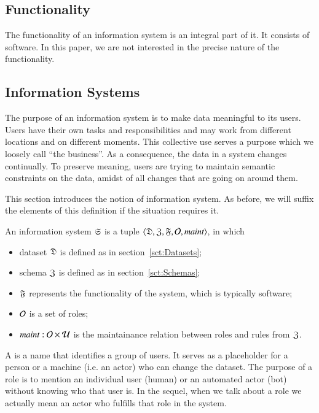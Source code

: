 \documentclass{elsarticle}
\begin{document}

\subsection{Functionality}
   The functionality of an information system is an integral part of it.
   It consists of software.
   In this paper, we are not interested in the precise nature of the functionality.

\subsection{Information Systems}
\label{sct:Information Systems}
   The purpose of an information system is to make data meaningful to its users.
   Users have their own tasks and responsibilities
   and may work from different locations and on different moments.
   This collective use serves a purpose which we loosely call ``the business''.
   As a consequence, the data in a system changes continually.
   To preserve meaning, users are trying to maintain semantic constraints on the data,
   amidst of all changes that are going on around them.

   This section introduces the notion of information system.
   As before, we will suffix the elements of this definition if the situation requires it.
\begin{definition}
\label{def:information system}
\item An information system $\mathfrak{S}$ is a tuple $\langle\mathfrak{D},\mathfrak{Z},\mathfrak{F},\mathcal{O},\text{\it maint\/}\rangle$, in which
\begin{itemize}
   \item dataset $\mathfrak{D}$ is defined as in section~\ref{sct:Datasets};
   \item schema $\mathfrak{Z}$ is defined as in section~\ref{sct:Schemas};
   \item $\mathfrak{F}$ represents the functionality of the system, which is typically software;
   \item $\mathcal{O}$ is a set of roles;
   \item $\text{\it maint\/} : \mathcal{O}\times\mathcal{U}$ is the maintainance relation between roles and rules from $\mathfrak{Z}$.
\end{itemize}
\end{definition}
   A  is a name that identifies a group of users.
   It serves as a placeholder for a person or a machine (i.e. an actor) who can change the dataset.
   The purpose of a role is to mention an individual user (human) or an automated actor (bot) without knowing who that user is.
   In the sequel, when we talk about a role we actually mean an actor who fulfills that role in the system.
\end{document}
